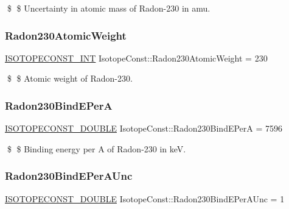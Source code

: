 \$ \$ Uncertainty in atomic mass of Radon-\/230 in amu. \mbox{\label{group___isotope_const-_radon-_rn230_ga3063f710b53b64bf92f170e222aa3da7}} 
\subsubsection{\texorpdfstring{Radon230\+Atomic\+Weight}{Radon230AtomicWeight}}
{\footnotesize\ttfamily \mbox{\hyperlink{group___isotope_const-_macros_ga5f18360b3e99483a35c32d789e62621c}{I\+S\+O\+T\+O\+P\+E\+C\+O\+N\+S\+T\+\_\+\+I\+NT}} Isotope\+Const\+::\+Radon230\+Atomic\+Weight = 230}

\$ \$ Atomic weight of Radon-\/230. \mbox{\label{group___isotope_const-_radon-_rn230_ga9fb0f0b8ef3264e616486edb061b4929}} 
\subsubsection{\texorpdfstring{Radon230\+Bind\+E\+PerA}{Radon230BindEPerA}}
{\footnotesize\ttfamily \mbox{\hyperlink{group___isotope_const-_macros_ga8f45a7272ce02c0b4c65c44636ed719a}{I\+S\+O\+T\+O\+P\+E\+C\+O\+N\+S\+T\+\_\+\+D\+O\+U\+B\+LE}} Isotope\+Const\+::\+Radon230\+Bind\+E\+PerA = 7596}

\$ \$ Binding energy per A of Radon-\/230 in keV. \mbox{\label{group___isotope_const-_radon-_rn230_ga02dc42d3648c5f74480948531576e628}} 
\subsubsection{\texorpdfstring{Radon230\+Bind\+E\+Per\+A\+Unc}{Radon230BindEPerAUnc}}
{\footnotesize\ttfamily \mbox{\hyperlink{group___isotope_const-_macros_ga8f45a7272ce02c0b4c65c44636ed719a}{I\+S\+O\+T\+O\+P\+E\+C\+O\+N\+S\+T\+\_\+\+D\+O\+U\+B\+LE}} Isotope\+Const\+::\+Radon230\+Bind\+E\+Per\+A\+Unc = 1}


